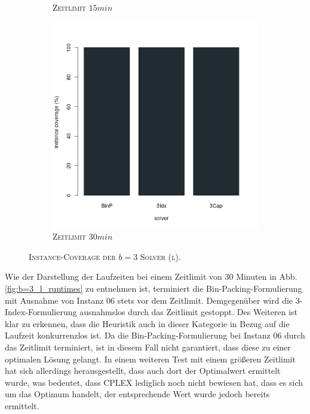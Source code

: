 \begin{figure}[H]
\begin{subfigure}[b]{0.3\textwidth}
\caption{\textsc{Zeitlimit} $15min$}
\label{fig:instance_coverage_b=3_l_b}
\end{subfigure}
\hfill
\begin{subfigure}[b]{0.3\textwidth}
\centering
\includegraphics[width=1.1\textwidth]{img/solver_instance_coverage_b=3_l_1800s.png}
\caption{\textsc{Zeitlimit} $30min$}
\label{fig:instance_coverage_b=3_l_c}
\end{subfigure}
\caption{\textsc{Instance-Coverage der $b = 3$ Solver (l)}.}
\label{}
\end{figure}

Wie der Darstellung der Laufzeiten bei einem Zeitlimit von $30$ Minuten in Abb. \ref{fig:b=3_l_runtimes} zu
entnehmen ist, terminiert die Bin-Packing-Formulierung mit Ausnahme von Instanz $06$ stets vor dem Zeitlimit.
Demgegenüber wird die 3-Index-Formulierung ausnahmslos durch das Zeitlimit gestoppt.
Des Weiteren ist klar zu erkennen, dass die Heuristik auch in dieser Kategorie in Bezug auf die Laufzeit konkurrenzlos ist. Da die Bin-Packing-Formulierung bei Instanz $06$ durch das Zeitlimit terminiert, ist in diesem Fall nicht garantiert, dass diese zu einer optimalen Lösung gelangt. In einem weiteren Test mit einem größeren Zeitlimit hat sich allerdings herausgestellt, dass auch dort der Optimalwert ermittelt wurde, was bedeutet, dass
\textsc{CPLEX} lediglich noch nicht bewiesen hat, dass es sich um das Optimum handelt, der entsprechende Wert wurde jedoch bereits ermittelt.


